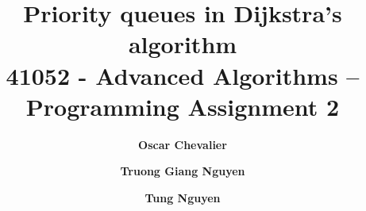 \documentclass{article}
\title{Priority queues in Dijkstra's algorithm
 \\ {\large 41052 - Advanced Algorithms – Programming Assignment 2}}
\author{
  \textbf{Oscar Chevalier} \\
  \code{Student ID: 24834347}
  \and
  \textbf{Truong Giang Nguyen} \\
  \code{Student ID: 25520038}
  \and
  \textbf{Tung Nguyen} \\
  \code{Student ID: 24666048}
}
\date{}
\begin{document}
\maketitle
\tableofcontents
\pagebreak












\end{document}

